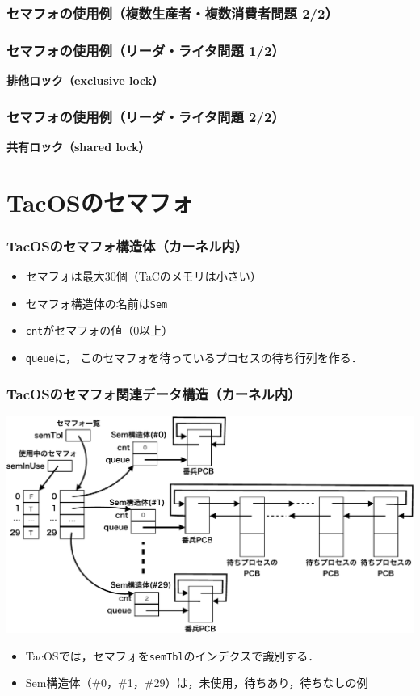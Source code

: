 \documentclass[dvipdfmx]{beamer}
\begin{document}
\begin{frame}
  \frametitle{セマフォの使用例（複数生産者・複数消費者問題 2/2）}
  
\end{frame}

\begin{frame}
  \frametitle{セマフォの使用例（リーダ・ライタ問題 1/2）}
  
  {\bf 排他ロック（exclusive lock）}
\end{frame}

\begin{frame}
  \frametitle{セマフォの使用例（リーダ・ライタ問題 2/2）}
  
  {\bf 共有ロック（shared lock）}
\end{frame}

\section{TacOSのセマフォ}
\begin{frame}
  \frametitle{TacOSのセマフォ構造体（カーネル内）}
  
  \begin{itemize}
    \item セマフォは最大30個（TaCのメモリは小さい）
    \item セマフォ構造体の名前は{\tt Sem}
    \item {\tt cnt}がセマフォの値（0以上）
    \item {\tt queue}に，
      このセマフォを待っているプロセスの待ち行列を作る．
  \end{itemize}
\end{frame}

\begin{frame}
  \frametitle{TacOSのセマフォ関連データ構造（カーネル内）}
  \begin{center}
    \includegraphics[scale=0.45]{Fig/tacosSemaphore-crop.pdf}
  \end{center}
  \begin{itemize}
    \item TacOSでは，セマフォを{\tt semTbl}のインデクスで識別する．
    \item Sem構造体（\#0，\#1，\#29）は，未使用，待ちあり，待ちなしの例
  \end{itemize}
\end{frame}
\end{document}
